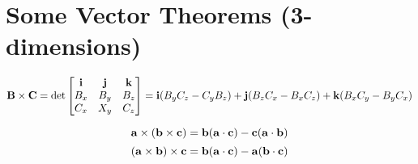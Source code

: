 \section{Some Vector Theorems (3-dimensions)}
\begin{align*}
{\bf B} \times {\bf C} = 
\det\begin{bmatrix}
{\bf i} & {\bf j} & {\bf k}\\
B_x & B_y & B_z  \\
C_x& X_y & C_z \\
\end{bmatrix} = {\bf i}(B_y C_z - C_y B_z) + {\bf j}(B_z C_x - B_x C_z) + {\bf k}(B_xC_y-B_yC_x) 
\end{align*}
   
\begin{theorem}
\[ {\bf a} \times ({\bf b} \times {\bf c}) = {\bf b}({\bf a}\cdot {\bf c}) - {\bf c}({\bf a}\cdot {\bf b}) \]
\[ ({\bf a} \times {\bf b}) \times {\bf c} = {\bf b}({\bf a}\cdot {\bf c}) - {\bf a}({\bf b}\cdot {\bf c}) \]
\end{theorem}


